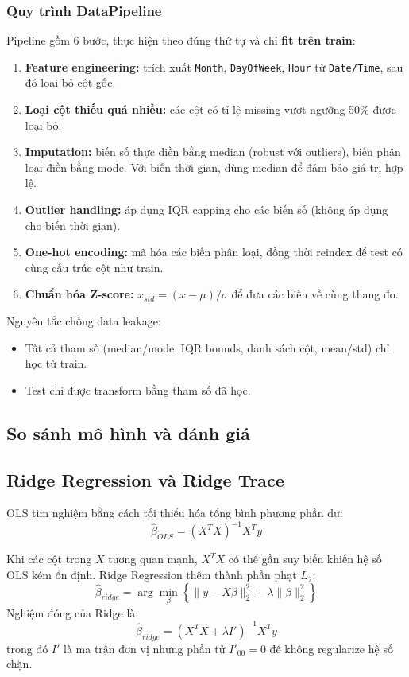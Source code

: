 \documentclass[a4paper]{article}
\begin{document}
\subsubsection{Quy trình DataPipeline}
Pipeline gồm 6 bước, thực hiện theo đúng thứ tự và chỉ \textbf{fit trên train}:
\begin{enumerate}
    \item \textbf{Feature engineering:} trích xuất \texttt{Month}, \texttt{DayOfWeek}, \texttt{Hour} từ \texttt{Date/Time}, sau đó loại bỏ cột gốc.
    \item \textbf{Loại cột thiếu quá nhiều:} các cột có tỉ lệ missing vượt ngưỡng 50\% được loại bỏ.
    \item \textbf{Imputation:} biến số thực điền bằng median (robust với outliers), biến phân loại điền bằng mode. Với biến thời gian, dùng median để đảm bảo giá trị hợp lệ.
    \item \textbf{Outlier handling:} áp dụng IQR capping cho các biến số (không áp dụng cho biến thời gian).
    \item \textbf{One-hot encoding:} mã hóa các biến phân loại, đồng thời reindex để test có cùng cấu trúc cột như train.
    \item \textbf{Chuẩn hóa Z-score:} $x_{std} = (x-\mu)/\sigma$ để đưa các biến về cùng thang đo.
\end{enumerate}

Nguyên tắc chống data leakage:
\begin{itemize}
    \item Tất cả tham số (median/mode, IQR bounds, danh sách cột, mean/std) chỉ học từ train.
    \item Test chỉ được transform bằng tham số đã học.
\end{itemize}

\subsection{So sánh mô hình và đánh giá}

\subsection{Ridge Regression và Ridge Trace}
OLS tìm nghiệm bằng cách tối thiểu hóa tổng bình phương phần dư:
\begin{equation}
\hat{\beta}_{OLS} = (X^T X)^{-1}X^T y
\end{equation}

Khi các cột trong $X$ tương quan mạnh, $X^T X$ có thể gần suy biến khiến hệ số OLS kém ổn định. Ridge Regression thêm thành phần phạt $L_2$:
\begin{equation}
\hat{\beta}_{ridge} = \arg\min_{\beta}\left\{\lVert y - X\beta \rVert_2^2 + \lambda \lVert \beta \rVert_2^2\right\}
\end{equation}
Nghiệm đóng của Ridge là:
\begin{equation}
\hat{\beta}_{ridge} = (X^T X + \lambda I')^{-1} X^T y
\end{equation}
trong đó $I'$ là ma trận đơn vị nhưng phần tử $I'_{00}=0$ để không regularize hệ số chặn.
\end{document}
